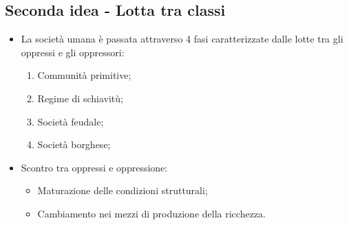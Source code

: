\documentclass{article}
\begin{document}
\subsection{Seconda idea - Lotta tra classi}
\begin{itemize}
    \item La società umana è passata attraverso 4 fasi caratterizzate dalle lotte tra gli
        oppressi e gli oppressori:
        \begin{enumerate}
            \item Communità primitive;
            \item Regime di schiavitù;
            \item Società feudale;
            \item Società borghese;
        \end{enumerate} 
    \item Scontro tra oppressi e oppressione:
        \begin{itemize}
            \item Maturazione delle condizioni strutturali;
            \item Cambiamento nei mezzi di produzione della ricchezza.
        \end{itemize}
\end{itemize}
\end{document}
